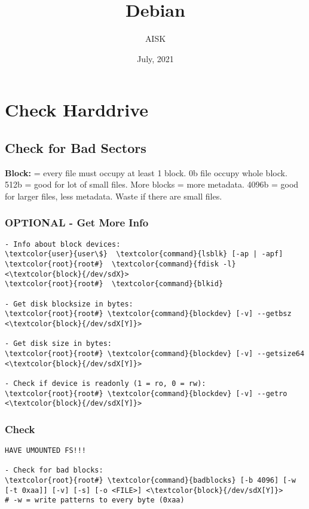 \documentclass[10pt, a4paper, onecolumn, openany]{book} %
\title{\textbf{Debian}}
\author{AISK}
\date{July, 2021}
\begin{document}
\maketitle
\tableofcontents


\chapter{Check Harddrive}
\section{Check for Bad Sectors}
\textbf{Block:} = every file must occupy at least 1 block. 0b file occupy whole block.\newline
512b = good for lot of small files. More blocks = more metadata.\newline
4096b =  good for larger files, less metadata. Waste if there are small files.
\subsection{OPTIONAL - Get More Info}
\begin{Verbatim}[commandchars=\\\{\}]
- Info about block devices:
\textcolor{user}{user\$}  \textcolor{command}{lsblk} [-ap | -apf]
\textcolor{root}{root#}  \textcolor{command}{fdisk -l} <\textcolor{block}{/dev/sdX}>
\textcolor{root}{root#}  \textcolor{command}{blkid}

- Get disk blocksize in bytes:
\textcolor{root}{root#} \textcolor{command}{blockdev} [-v] --getbsz <\textcolor{block}{/dev/sdX[Y]}>

- Get disk size in bytes:
\textcolor{root}{root#} \textcolor{command}{blockdev} [-v] --getsize64 <\textcolor{block}{/dev/sdX[Y]}>

- Check if device is readonly (1 = ro, 0 = rw):
\textcolor{root}{root#} \textcolor{command}{blockdev} [-v] --getro <\textcolor{block}{/dev/sdX[Y]}>
\end{Verbatim}

\subsection{Check}
\begin{Verbatim}[commandchars=\\\{\}]
HAVE UMOUNTED FS!!!

- Check for bad blocks:
\textcolor{root}{root#} \textcolor{command}{badblocks} [-b 4096] [-w [-t 0xaa]] [-v] [-s] [-o <FILE>] <\textcolor{block}{/dev/sdX[Y]}>
# -w = write patterns to every byte (0xaa)
\end{Verbatim}
\end{document}
